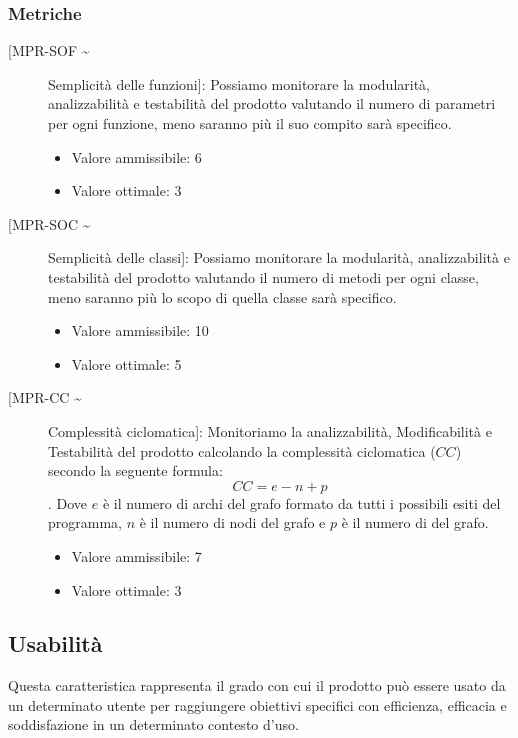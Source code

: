 \documentclass[../piano-di-qualifica.tex]{subfiles}
\begin{document}
\subsubsection{Metriche}%
\label{subs:metriche}
  \begin{description}
    \item [[MPR-SOF \textasciitilde] Semplicità delle funzioni]: Possiamo monitorare la modularità, analizzabilità e testabilità del prodotto valutando il numero di parametri per ogni funzione, meno saranno più il suo compito sarà specifico.
      \begin{itemize}   \item Valore ammissibile: \leq{}  6 \item Valore ottimale: \leq{}  3 \end{itemize}
    \item [[MPR-SOC \textasciitilde] Semplicità delle classi]: Possiamo monitorare la modularità, analizzabilità e testabilità del prodotto valutando il numero di metodi per ogni classe, meno saranno più lo scopo di quella classe sarà specifico.
      \begin{itemize} \item Valore ammissibile: \leq{}  10 \item Valore ottimale: \leq{}  5 \end{itemize}
    \item [[MPR-CC \textasciitilde] Complessità ciclomatica]: Monitoriamo la analizzabilità, Modificabilità e Testabilità del prodotto calcolando la complessità ciclomatica (\(CC\)) secondo la seguente formula: \begin{equation} CC = e - n + p \end{equation}. Dove \(e\) è il numero di archi del grafo formato da tutti i possibili esiti del programma, \(n\) è il numero di nodi del grafo e \(p\) è il numero di  del grafo.
      \begin{itemize} \item Valore ammissibile: \leq{}  7 \item Valore ottimale: \leq{}  3 \end{itemize}
  \end{description}


\subsection{Usabilità}%
\label{sub:usabilita}
Questa caratteristica rappresenta il grado con cui il prodotto può essere usato da un determinato utente per raggiungere obiettivi specifici con efficienza, efficacia e soddisfazione in un determinato contesto d'uso.
\end{document}

